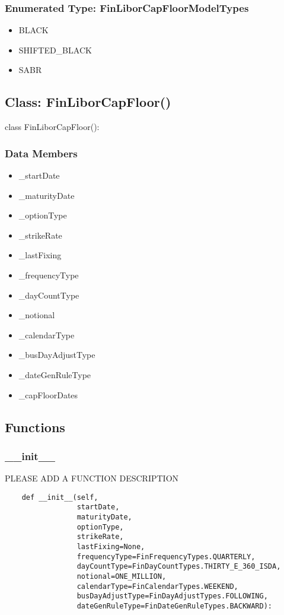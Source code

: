 \documentclass[twoside,11pt]{book}
\begin{document}
\subsubsection{Enumerated Type: FinLiborCapFloorModelTypes}
\begin{itemize}
\item{BLACK}
\item{SHIFTED\_BLACK}
\item{SABR}
\end{itemize}

\subsection*{Class: FinLiborCapFloor()}
class FinLiborCapFloor(): 

\subsubsection*{Data Members}
\begin{itemize}
\item{\_startDate}
\item{\_maturityDate}
\item{\_optionType}
\item{\_strikeRate}
\item{\_lastFixing}
\item{\_frequencyType}
\item{\_dayCountType}
\item{\_notional}
\item{\_calendarType}
\item{\_busDayAdjustType}
\item{\_dateGenRuleType}
\item{\_capFloorDates}
\end{itemize}

\subsection*{Functions}

\subsubsection*{{\bf \_\_init\_\_}}
PLEASE ADD A FUNCTION DESCRIPTION

\begin{lstlisting}
    def __init__(self,
                 startDate,
                 maturityDate,
                 optionType,
                 strikeRate,
                 lastFixing=None,
                 frequencyType=FinFrequencyTypes.QUARTERLY,
                 dayCountType=FinDayCountTypes.THIRTY_E_360_ISDA,
                 notional=ONE_MILLION,
                 calendarType=FinCalendarTypes.WEEKEND,
                 busDayAdjustType=FinDayAdjustTypes.FOLLOWING,
                 dateGenRuleType=FinDateGenRuleTypes.BACKWARD):
\end{lstlisting}
\end{document}
